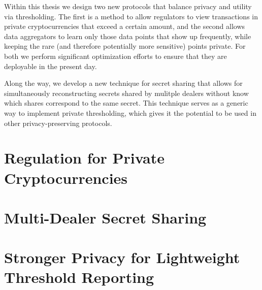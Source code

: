 Within this thesis we design two new protocols that balance privacy and utility via thresholding.
The first is a method to allow regulators to view transactions in private cryptocurrencies that exceed a certain amount, and the second allows data aggregators to learn only those data points that show up frequently, while keeping the rare (and therefore potentially more sensitive) points private.
For both we perform significant optimization efforts to ensure that they are deployable in the present day.

Along the way, we develop a new technique for secret sharing that allows for simultaneously reconstructing secrets shared by mulitple dealers without know which shares correspond to the same secret.
This technique serves as a generic way to implement private thresholding, which gives it the potential to be used in other privacy-preserving protocols.

\section{Regulation for Private Cryptocurrencies}


\section{Multi-Dealer Secret Sharing}


\section{Stronger Privacy for Lightweight Threshold Reporting}

